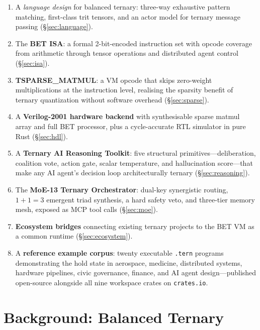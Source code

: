 \documentclass[journal,10pt,twocolumn]{IEEEtran}
\begin{document}
\begin{enumerate}
  \item A \emph{language design} for balanced ternary: three-way exhaustive
        pattern matching, first-class trit tensors, and an actor model for
        ternary message passing (\S\ref{sec:language}).
  \item The \textbf{BET ISA}: a formal 2-bit-encoded instruction set with
        opcode coverage from arithmetic through tensor operations and
        distributed agent control (\S\ref{sec:isa}).
  \item \textbf{TSPARSE\_MATMUL}: a VM opcode that skips zero-weight
        multiplications at the instruction level, realising the sparsity
        benefit of ternary quantization without software overhead
        (\S\ref{sec:sparse}).
  \item A \textbf{Verilog-2001 hardware backend} with synthesisable sparse
        matmul array and full BET processor, plus a cycle-accurate RTL
        simulator in pure Rust (\S\ref{sec:hdl}).
  \item A \textbf{Ternary AI Reasoning Toolkit}: five structural
        primitives—deliberation, coalition vote, action gate, scalar
        temperature, and hallucination score—that make any AI agent's
        decision loop architecturally ternary (\S\ref{sec:reasoning}).
  \item The \textbf{MoE-13 Ternary Orchestrator}: dual-key synergistic
        routing, $1{+}1{=}3$ emergent triad synthesis, a hard safety veto,
        and three-tier memory mesh, exposed as MCP tool calls
        (\S\ref{sec:moe}).
  \item \textbf{Ecosystem bridges} connecting existing ternary projects to
        the BET VM as a common runtime (\S\ref{sec:ecosystem}).
  \item A \textbf{reference example corpus}: twenty executable
        \texttt{.tern} programs demonstrating the hold state in aerospace,
        medicine, distributed systems, hardware pipelines, civic governance,
        finance, and AI agent design—published open-source alongside all
        nine workspace crates on \texttt{crates.io}.
\end{enumerate}

\section{Background: Balanced Ternary}
\label{sec:background}
\end{document}
